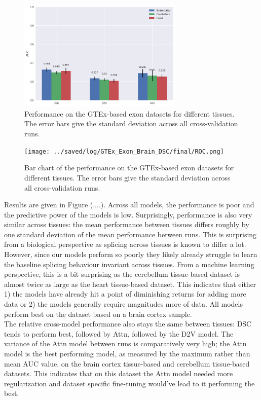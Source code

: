\begin{figure}
	\centering\includegraphics[width=0.7\textwidth]{../visualizations/gtex_exon_barcharts.png} 
	\caption{Performance on the GTEx-based exon datasets for different tissues. The error bars give the standard deviation across all cross-validation runs. }
	\label{fig:gtex_exon_barcharts}
\end{figure}

\begin{figure}
	\centering\texttt{[image: ../saved/log/GTEx\_Exon\_Brain\_DSC/final/ROC.png]} 
	\caption{Bar chart of the performance on the GTEx-based exon datasets for different tissues. The error bars give the standard deviation across all cross-validation runs.  }
	\label{fig:gtex_exon_roc}
\end{figure}

Results are given in Figure (....). Across all models, the performance is poor and the predictive power of the models is low. Surprisingly, performance is also very similar across tissues: the mean performance between tissues differs roughly by one standard deviation of the mean performance between runs. This is surprising from a biological perspective as splicing across tissues is known to differ a lot. However, since our models perform so poorly they likely already struggle to learn the baseline splicing behaviour invariant across tissues. From a machine learning perspective, this is a bit surprising as the cerebellum tissue-based dataset is almost twice as large as the heart tissue-based dataset. This indicates that either 1) the models have already hit a point of diminishing returns for adding more data or 2) the models generally require magnitudes more of data. All models perform best on the dataset based on a brain cortex sample. \\
The relative cross-model performance also stays the same between tissues: DSC tends to perform best, followed by Attn, followed by the D2V model. The variance of the Attn model between runs is comparatively very high; the Attn model is the best performing model, as measured by the maximum rather than mean AUC value, on the brain cortex tissue-based and cerebellum tissue-based datasets. This indicates that on this dataset the Attn model needed more regularization and dataset specific fine-tuning would've lead to it performing the best. 


